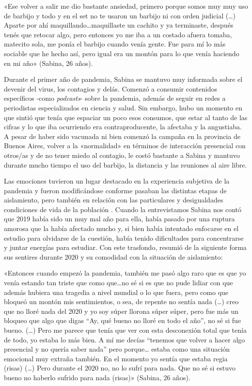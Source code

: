 \begin{refsection}
\begin{gbcita}
«Ese volver a salir me dio bastante ansiedad, primero porque somos muy muy uso de barbijo y todo y en el set no te usaron un barbijo ni con orden judicial (…) Aparte por ahí maquillando…maquillaste un cachito y ya terminaste, después tenés que retocar algo, pero entonces yo me iba a un costado afuera tomaba, matecito sola, me ponía el barbijo cuando venía gente. Fue para mí lo más sociable que he hecho así, pero igual era un montón para lo que venía haciendo en mi año» (Sabina, 26 años).

\end{gbcita}

Durante el primer año de pandemia, Sabina se mantuvo muy informada sobre el devenir del virus, los contagios y delás. Comenzó a consumir contenidos específicos -como \emph{podcasts}- sobre la pandemia, además de seguir en redes a periodistas especializados en ciencia y salud. Sin embargo, hubo un momento en que sintió que tenía que espaciar un poco esos consumos, que estar al tanto de las cifras y lo que iba ocurriendo era contraproducente, la afectaba y la angustiaba. A pesar de haber sido vacunada ni bien comenzó la campaña en la provincia de Buenos Aires, volver a la «normalidad» en términos de interacción presencial con otros/as y de no tener miedo al contagio, le costó bastante a Sabina y mantuvo durante mucho tiempo el uso del barbijo, la distancia y las reuniones al aire libre.

Las emociones tuvieron un lugar destacado en la experiencia subjetiva de la pandemia y fueron modificándose conforme pasaban las distintas etapas de aislamiento, pero también en relación con las particulares y desigualdades condiciones de vida de la población \protect\parencite{4236-SIMONETTI2024}. Cuando la entrevistamos Sabina nos contó que 2019 había sido un muy mal año para ella, había pasado por una ruptura amorosa que la había afectado mucho y, si bien había intentado enfocarse en el estudio para olvidarse de la cuestión, había tenido dificultades para concentrarse y juntar energías para estudiar. Con este trasfondo, resumió de la siguiente forma sus sentires durante 2020 y su comodidad con la situación de aislamiento:


\begin{gbcita}
«Entonces cuando empezó la pandemia, también me pasó algo raro que es que yo venía estando tan triste que como que…no sé si es que no pude lidiar con que además hubiera una tragedia a nivel mundial o lo que fuera, pero como que bloqueó un montón mis sentimientos, o sea, de repente no sentía nada (…) creo que no lloré nada del 2020 y yo soy súper llorona súper súper, pero fue más un bloqueo que algo que digas “Ay, qué bueno no lloré en todo el año”, no sé si fue bueno. (…) Pero me parece que tenía que ver con esta desconexión total que tenía de todo, yo estaba lo más bien. A mí me decías “tenemos que volver a hacer algo presencial y no quería saber nada” pero porque… estaba como una situación emocional muy extraña también. En el momento yo sentía que estaba regia (risas) (…) Pero durante el 2020 no, no lo sufrí para nada. Que no sé si estuvo bueno no haberlo sufrido para nada (risas)» (Sabina, 26 años).


\end{gbcita}
\end{refsection}
